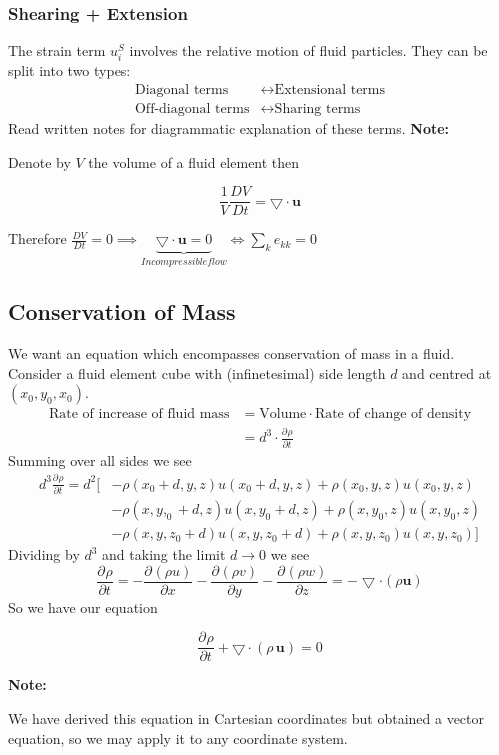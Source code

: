 \documentclass[11pt]{article}
\newcommand*{\pd}[3][]{\ensuremath{\frac{\partial^{#1} {#2}}{\partial {#3}^{#1}}}}
\newcommand*{\md}[1]{\ensuremath{\frac{D #1}{D t}}}
\newcommand{\grad}{\bigtriangledown}
\newcommand{\mv}[1]{\textbf{#1}}
\newenvironment{note}
    {\textbf{Note:}\begin{mdframed}[backgroundcolor=white, roundcorner=5pt, linewidth=0pt]}
    {\end{mdframed}}
\newenvironment{formula}
	{\begin{mdframed}[backgroundcolor=white, roundcorner=5pt, linewidth=1pt, linecolor=red]}
	{\end{mdframed}}
\begin{document}
\subsubsection{Shearing + Extension}
The strain term $u_i^S$ involves the relative motion of fluid particles. They can be split into two types:
\begin{align*}
    \text{Diagonal terms} &\longleftrightarrow \text{Extensional terms}\\
    \text{Off-diagonal terms} &\longleftrightarrow \text{Sharing terms}
\end{align*}
Read written notes for diagrammatic explanation of these terms.
\begin{note}
Denote by $V$ the volume of a fluid element then
\begin{formula}
$$\frac{1}{V}\md{V} = \grad\cdot\mv{u}$$
\end{formula}
Therefore $\md{V}=0\implies\underbrace{\grad\cdot\mv{u}=0}_{Incompressible flow}\iff\sum_k e_{kk}=0$
\end{note}

\subsection{Conservation of Mass}
We want an equation which encompasses conservation of mass in a fluid. Consider a fluid element cube with (infinetesimal) side length $d$ and centred at $(x_0,y_0,x_0)$.
\begin{align*}
    \text{Rate of increase of fluid mass} &= \text{Volume} \cdot \text{Rate of change of density}\\
    &= d^3 \cdot \pd{\rho}{t}
\end{align*}
Summing over all sides we see
\begin{align*}
d^3\pd{\rho}{t}=d^2[&-\rho(x_0+d,y,z)u(x_0+d,y,z)+\rho(x_0,y,z)u(x_0,y,z)\\
                    &-\rho(x,y,_0+d,z)u(x,y_0+d,z)+\rho(x,y_0,z)u(x,y_0,z)\\
                    &-\rho(x,y,z_0+d)u(x,y,z_0+d)+\rho(x,y,z_0)u(x,y,z_0)]
\end{align*}
Dividing by $d^3$ and taking the limit $d\to 0$ we see
$$\pd{\rho}{t}=-\pd{(\rho u)}{x} - \pd{(\rho v)}{y} - \pd{(\rho w)}{z} = -\grad\cdot(\rho\mv{u})$$
So we have our equation
\begin{formula}
$$\pd{\rho}{t}+\grad\cdot(\rho\,\mv{u})=0$$
\end{formula}
\begin{note}
	We have derived this equation in Cartesian coordinates but obtained a vector equation, so we may apply it to any coordinate system.
\end{note}
\end{document}
